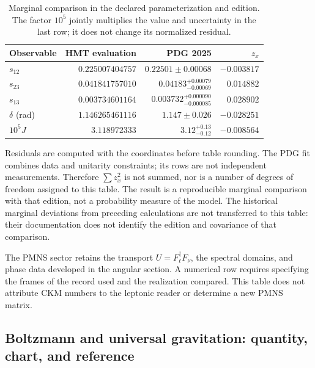 \begin{table}[htbp]
\centering\small
\setlength{\tabcolsep}{4pt}
\begin{tabular}{@{}lrrr@{}}
\toprule
Observable & HMT evaluation & PDG 2025 & \(z_x\)\\
\midrule
\(s_{12}\) & \(0.225007404757\) & \(0.22501\pm0.00068\) & \(-0.003817\)\\
\(s_{23}\) & \(0.041841757010\) & \(0.04183^{+0.00079}_{-0.00069}\) & \(0.014882\)\\
\(s_{13}\) & \(0.003734601164\) & \(0.003732^{+0.000090}_{-0.000085}\) & \(0.028902\)\\
\(\delta\) (rad) & \(1.146265461116\) & \(1.147\pm0.026\) & \(-0.028251\)\\
\(10^5J\) & \(3.118972333\) & \(3.12^{+0.13}_{-0.12}\) & \(-0.008564\)\\
\bottomrule
\end{tabular}
\caption{Marginal comparison in the declared parameterization and edition.
The factor \(10^5\) jointly multiplies the value and uncertainty in the
last row; it does not change its normalized residual.}
\label{tab:ii-ckm-comparacion}
\end{table}

Residuals are computed with the coordinates before table
rounding. The PDG fit combines data and unitarity constraints;
its rows are not independent measurements. Therefore
\(\sum z_x^2\) is not summed, nor is a number of degrees of freedom assigned to this table.
The result is a reproducible marginal comparison with that edition,
not a probability measure of the model. The historical marginal deviations
from preceding calculations are not transferred to this table:
their documentation does not identify the edition and covariance of that comparison.

The PMNS sector retains the transport \(U=F_\ell^\dagger F_\nu\), the
spectral domains, and phase data developed in the angular
section. A numerical row requires specifying the frames of the record
used and the realization compared. This table does not attribute CKM numbers
to the leptonic reader or determine a new PMNS matrix.

\subsection{Boltzmann and universal gravitation: quantity, chart, and reference}

